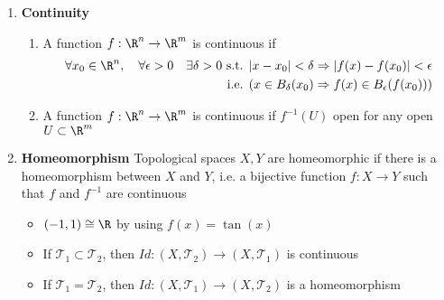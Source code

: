 \documentclass[10.5pt]{article}
\newcommand{\calT}{\mathcal{T}}
\begin{document}
\begin{enumerate}
    \item \textbf{Continuity}
    \begin{enumerate}
        \item A function $f:\R^n \to \R^m$ is continuous if 
        \begin{align*}
            \forall x_0 \in \R^n, \quad \forall \epsilon > 0 \quad \exists \delta > 0 \text{ s.t. } & |x-x_0|<\delta \Rightarrow |f(x)-f(x_0)|<\epsilon \\ 
            \text{ i.e. } & (x\in B_{\delta}(x_0) \Rightarrow f(x)\in B_{\epsilon}(f(x_0)))
        \end{align*}
        \item A function $f:\R^n \to \R^m$ is continuous if $f^{-1}(U)$ open for any open $U\subset \R^m$
    \end{enumerate}
    \item \textbf{Homeomorphism} Topological spaces $X,Y$ are homeomorphic if there is a homeomorphism between $X$ and $Y$, i.e. a bijective function $f:X\to Y$ such that $f$ and $f^{-1}$ are continuous
    \begin{itemize}
        \item $(-1,1) \cong \R$ by using $f(x) = \tan(x)$
        \item If $\calT_1 \subset \calT_2$, then $Id: (X,\calT_2) \to (X,\calT_1)$ is continuous
        \item If $\calT_1 = \calT_2$, then $Id: (X, \calT_1) \to (X,\calT_2)$ is a homeomorphism
    \end{itemize}
\end{enumerate}
\end{document}
